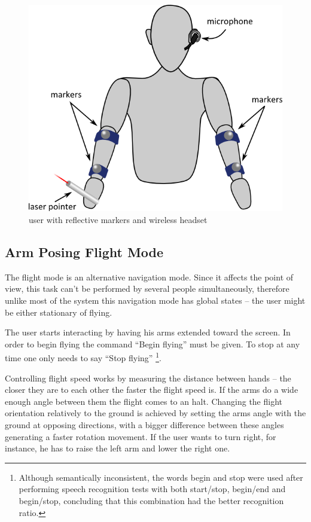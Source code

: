 \begin{figure}[ht]
	\centering
		\includegraphics[scale=1.3]{gfx/markers2.png}
	\caption{user with reflective markers and wireless headset}
	\label{fig:markers2}
\end{figure}



\subsection{Arm Posing Flight Mode}

The flight mode is an alternative navigation mode. Since it affects the point of view, this task can't be performed by
several people simultaneously, therefore unlike most of the system this navigation mode has global states
-- the user might be either stationary of flying.

The user starts interacting by having his arms extended toward the screen.
In order to begin flying the command ``Begin flying'' must be given.
To stop at any time one only needs to say ``Stop flying''
\footnote{Although semantically inconsistent, the words begin and stop were used after performing speech recognition
tests with both start/stop, begin/end and begin/stop, concluding that this combination had the better recognition ratio.}.

Controlling flight speed works by measuring the distance between hands -- the closer they are to each other the faster
the flight speed is. If the arms do a wide enough angle between them the flight comes to an halt.
Changing the flight orientation relatively to the ground is achieved by setting the arms angle with the ground at opposing directions,
with a bigger difference between these angles generating a faster rotation movement. If the user wants to turn right, for instance,
he has to raise the left arm and lower the right one.

